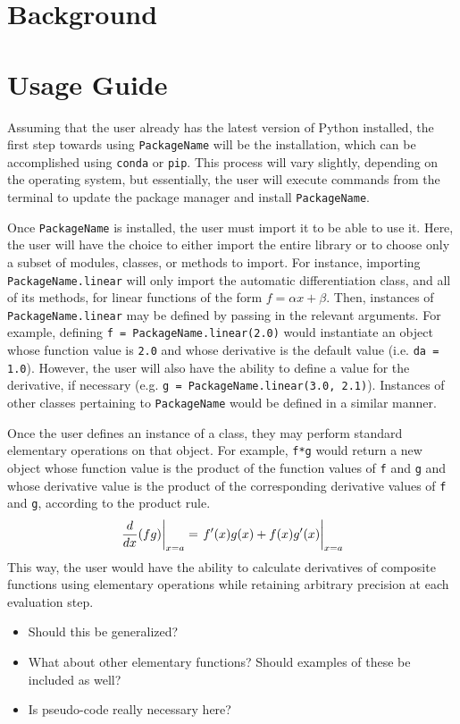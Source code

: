     \section*{Background}
    
    \section*{Usage Guide}
    Assuming that the user already has the latest version of Python installed, 
    the first step towards using \texttt{PackageName} will be the installation, 
    which can be accomplished using \texttt{conda} or \texttt{pip}. This process
    will vary slightly, depending on the operating system, but essentially, the 
    user will execute commands from the terminal to update the package manager 
    and install \texttt{PackageName}. 
    
    Once \texttt{PackageName} is installed, the user must import it to be able 
    to use it. Here, the user will have the choice to either import the entire 
    library or to choose only a subset of modules, classes, or methods to import.
    For instance, importing \texttt{PackageName.linear} will only import the 
    automatic differentiation class, and all of its methods, for linear 
    functions of the form $f = \alpha x + \beta$. Then, instances of 
    \texttt{PackageName.linear} may be defined by passing in the relevant 
    arguments. For example, defining \texttt{f = PackageName.linear(2.0)} would 
    instantiate an object whose function value is \texttt{2.0} and whose 
    derivative is the default value (i.e. \texttt{da = 1.0}). However, the user 
    will also have the ability to define a value for the derivative, if 
    necessary (e.g. \texttt{g = PackageName.linear(3.0, 2.1)}). Instances of 
    other classes pertaining to \texttt{PackageName} would be defined in a 
    similar manner. 
    
    Once the user defines an instance of a class, they may perform standard 
    elementary operations on that object. For example, \texttt{f*g} would return
    a new object whose function value is the product of the function values of 
    \texttt{f} and \texttt{g} and whose derivative value is the product of the
    corresponding derivative values of \texttt{f} and \texttt{g}, according 
    to the product rule. 
    \begin{equation}
        \left.\frac{d}{dx}(fg)\right|_{x=a} 
        = 
        \left.\vphantom{\frac{d}{dx}}f'(x)g(x) + f(x)g'(x)\right|_{x=a}
    \end{equation}
    This way, the user would have the ability to calculate derivatives of 
    composite functions using elementary operations while retaining arbitrary 
    precision at each evaluation step.
    \begin{itemize}
        \item Should this be generalized?
        \item What about other elementary functions? Should examples of these be
        included as well?
        \item Is pseudo-code really necessary here?
    \end{itemize} 

